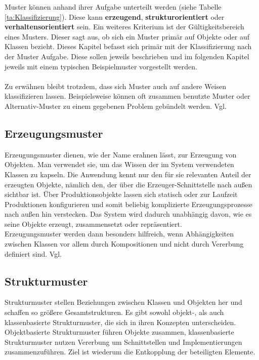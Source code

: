 \documentclass[fontsize=11pt,a4paper,final]{scrreprt}[2003/01/01]
\begin{document}
Muster können anhand ihrer Aufgabe unterteilt werden (siehe Tabelle \ref{ta:Klassifizierung}). Diese kann \textbf{ erzeugend},\textbf{ strukturorientiert} oder \textbf{verhaltensorientiert} sein. Ein weiteres Kriterium ist der Gültigkeitsbereich eines Musters. Dieser sagt aus, ob sich ein Muster primär auf Objekte oder auf Klassen bezieht.
Dieses Kapitel befasst sich primär mit der Klassifizierung nach der Muster Aufgabe. Diese sollen jeweils beschrieben und im folgenden Kapitel jeweils mit einem typischen Beispielmuster vorgestellt werden. 
\\ \\
Zu erwähnen bleibt trotzdem, dass sich Muster auch auf andere Weisen klassifizieren lassen. Beispielsweise können oft zusammen benutzte Muster oder Alternativ-Muster zu einem gegebenen Problem gebündelt werden. Vgl. \cite[S. 14]{gamma2004}

\subsection{Erzeugungsmuster}\label{se:Erzeugungsmuster}

Erzeugungsmuster dienen, wie der Name erahnen lässt, zur Erzeugung von Objekten. Man verwendet sie, um das Wissen der im System verwendeten Klassen zu kapseln. Die Anwendung kennt nur den für sie relevanten Anteil der erzeugten Objekte, nämlich den, der über die Erzeuger-Schnittstelle nach außen sichtbar ist. Über Produktionsobjekte lassen sich statisch oder zur Laufzeit Produktionen konfigurieren und somit beliebig komplizierte Erzeugungsprozesse nach außen hin verstecken. Das System wird dadurch unabhängig davon, wie es seine Objekte erzeugt, zusammensetzt oder repräsentiert. 
\\
Erzeugungsmuster werden dann besonders hilfreich, wenn Abhängigkeiten zwischen Klassen vor allem durch Kompositionen und nicht durch Vererbung definiert sind. Vgl. \cite[S. 101]{gamma2004}

\subsection{Strukturmuster}\label{se:Strukturmuster}

Strukturmuster stellen Beziehungen zwischen Klassen und Objekten her und schaffen so größere Gesamtstrukturen. Es gibt sowohl objekt-, als auch klassenbasierte Strukturmuster, die sich in ihren Konzepten unterscheiden. Objektbasierte Strukturmuster führen Objekte zusammen, klassenbasierte Strukturmuster nutzen Vererbung um Schnittstellen und Implementierungen zusammenzuführen. Ziel ist wiederum die Entkopplung der beteiligten Elemente.
\end{document}
